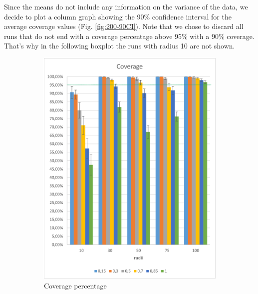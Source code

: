 Since the means do not include any information on the variance of the data, we decide to plot a column graph showing the 90\% confidence interval for the average coverage values (Fig. \ref{fig:200-90CI}). Note that we chose to discard all runs that do not end with a coverage percentage above 95\% with a 90\% coverage. That's why in the following boxplot the runs with radius 10 are not shown.

\begin{figure}[h!]
\centering
\begin{subfigure}{.5\textwidth}
  \centering
  \includegraphics[width=1\linewidth]{./images/200coverageCI.png}
  \caption{Coverage percentage}
  \label{fig:sub1}
\end{subfigure}%
\begin{subfigure}{.5\textwidth}
  \centering

\end{subfigure}
\end{figure}
